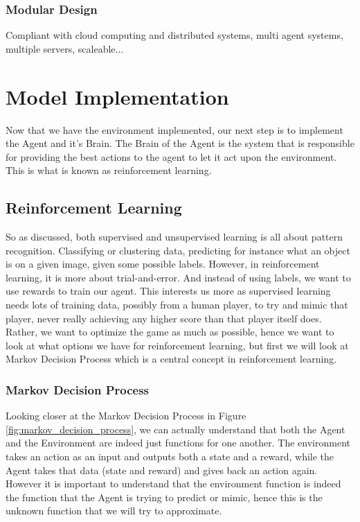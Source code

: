 \documentclass[
a4paper,
11pt,
english
]{report}
\begin{document}
\subsubsection{Modular Design}
Compliant with cloud computing and distributed systems, multi agent systems, multiple servers, scaleable...

\section{Model Implementation}
Now that we have the environment implemented, our next step is to implement the Agent and it's Brain. The Brain of the Agent is the system that is responsible for providing the best actions to the agent to let it act upon the environment. This is what is known as reinforcement learning.

\subsection{Reinforcement Learning}
So as discussed, both supervised and unsupervised learning is all about pattern recognition. Classifying or clustering data, predicting for instance what an object is on a given image, given some possible labels. However, in reinforcement learning, it is more about trial-and-error. And instead of using labels, we want to use rewards to train our agent. This interests us more as supervised learning needs lots of training data, possibly from a human player, to try and mimic that player, never really achieving any higher score than that player itself does. Rather, we want to optimize the game as much as possible, hence we want to look at what options we have for reinforcement learning, but first we will look at Markov Decision Process which is a central concept in reinforcement learning.

\subsubsection{Markov Decision Process}
Looking closer at the Markov Decision Process in Figure \ref{fig:markov_decision_process}, we can actually understand that both the Agent and the Environment are indeed just functions for one another. The environment takes an action as an input and outputs both a state and a reward, while the Agent takes that data (state and reward) and gives back an action again. However it is important to understand that the environment function is indeed the function that the Agent is trying to predict or mimic, hence this is the unknown function that we will try to approximate.
\end{document}
